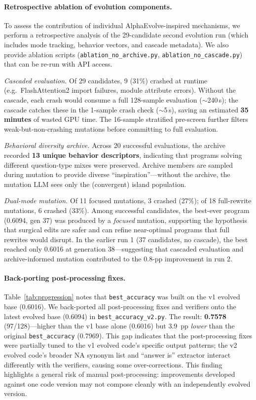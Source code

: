 \documentclass{article}
\begin{document}
\paragraph{Retrospective ablation of evolution components.}
To assess the contribution of individual AlphaEvolve-inspired mechanisms, we
perform a retrospective analysis of the 29-candidate second evolution run (which
includes mode tracking, behavior vectors, and cascade metadata).
We also provide ablation scripts (\texttt{ablation\_no\_archive.py},
\texttt{ablation\_no\_cascade.py}) that can be re-run with API
access.

\emph{Cascaded evaluation.} Of 29 candidates, 9 (31\%) crashed at runtime
(e.g.\ FlashAttention2 import failures, module attribute errors).
Without the cascade, each crash would consume a full 128-sample evaluation
($\sim$240\,s); the cascade catches these in the 1-sample crash check
($\sim$5\,s), saving an estimated \textbf{35 minutes} of wasted GPU time.
The 16-sample stratified pre-screen further filters weak-but-non-crashing
mutations before committing to full evaluation.

\emph{Behavioral diversity archive.} Across 20 successful evaluations, the
archive recorded \textbf{13 unique behavior descriptors}, indicating that
programs solving different question-type mixes were preserved. Archive members
are sampled during mutation to provide diverse ``inspiration''---without the
archive, the mutation LLM sees only the (convergent) island population.

\emph{Dual-mode mutation.}
Of 11 focused mutations, 3 crashed (27\%); of 18 full-rewrite mutations,
6 crashed (33\%). Among successful candidates, the best-ever program
(0.6094, gen 37) was produced by a \emph{focused} mutation, supporting
the hypothesis that surgical edits are safer and can refine near-optimal
programs that full rewrites would disrupt. In the earlier run 1 (37
candidates, no cascade), the best reached only 0.6016 at generation
38---suggesting that cascaded evaluation and archive-informed mutation
contributed to the 0.8-pp improvement in run 2.

\paragraph{Back-porting post-processing fixes.}
Table~\ref{tab:progression} notes that \texttt{best\_accuracy} was built on the
v1 evolved base (0.6016). We back-ported all post-processing fixes and
verifiers onto the latest evolved base (0.6094) in
\texttt{best\_accuracy\_v2.py}. The result: \textbf{0.7578} (97/128)---higher
than the v1 base alone (0.6016) but 3.9~pp \emph{lower} than the original
\texttt{best\_accuracy} (0.7969). This gap indicates that the post-processing
fixes were partially tuned to the v1 evolved code's specific output patterns;
the v2 evolved code's broader NA synonym list and ``answer is'' extractor
interact differently with the verifiers, causing some over-corrections.
This finding highlights a general risk of manual post-processing:
improvements developed against one code version may not compose cleanly
with an independently evolved version.
\end{document}
